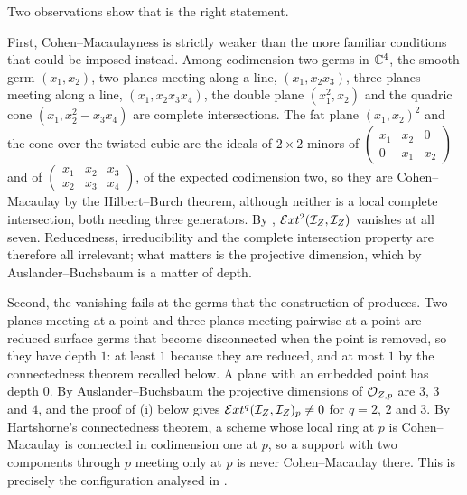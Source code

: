 \begin{remark}%
\label{rem:cmsharp}
Two observations show that  is the right statement.

First, Cohen--Macaulayness is strictly weaker than the more familiar
conditions that could be imposed instead. Among codimension two germs in
$\mathbb{C}^{4}$, the smooth germ $(x_{1},x_{2})$, two planes meeting along a line,
$(x_{1},x_{2}x_{3})$, three planes meeting along a line,
$(x_{1},x_{2}x_{3}x_{4})$, the double plane $(x_{1}^{2},x_{2})$ and the
quadric cone $(x_{1},x_{2}^{2}-x_{3}x_{4})$ are complete intersections. The
fat plane $(x_{1},x_{2})^{2}$ and the cone over the twisted cubic are the
ideals of $2\times2$ minors of
$\left(\begin{smallmatrix}x_{1}&x_{2}&0\\
0&x_{1}&x_{2}\end{smallmatrix}\right)$ and of
$\left(\begin{smallmatrix}x_{1}&x_{2}&x_{3}\\
x_{2}&x_{3}&x_{4}\end{smallmatrix}\right)$, of the expected codimension two,
so they are Cohen--Macaulay by the Hilbert--Burch theorem, although neither
is a local complete intersection, both needing three generators. By
, $\mathcal{E} xt^{2}(\mathcal{I}_{Z},\mathcal{I}_{Z})$ vanishes at all seven.
Reducedness, irreducibility and the complete intersection property are
therefore all irrelevant; what matters is the projective dimension, which by
Auslander--Buchsbaum is a matter of depth.

Second, the vanishing fails at the germs that the construction of
 produces. Two planes meeting at a point and three planes
meeting pairwise at a point are reduced surface germs that become
disconnected when the point is removed, so they have depth $1$: at least $1$
because they are reduced, and at most $1$ by the connectedness theorem
recalled below. A plane with an embedded point has depth $0$. By Auslander--Buchsbaum the projective
dimensions of $\mathcal{O}_{Z,p}$ are $3$, $3$ and $4$, and the proof of
(i) below gives $\mathcal{E} xt^{q}(\mathcal{I}_{Z},\mathcal{I}_{Z})_{p}\ne0$
for $q=2$, $2$ and $3$. By Hartshorne's connectedness theorem, a scheme whose local ring at $p$
is Cohen--Macaulay is connected in codimension one at $p$, so a support with
two components through $p$ meeting only at $p$ is never Cohen--Macaulay
there. This is precisely the configuration analysed in
.
\end{remark}

